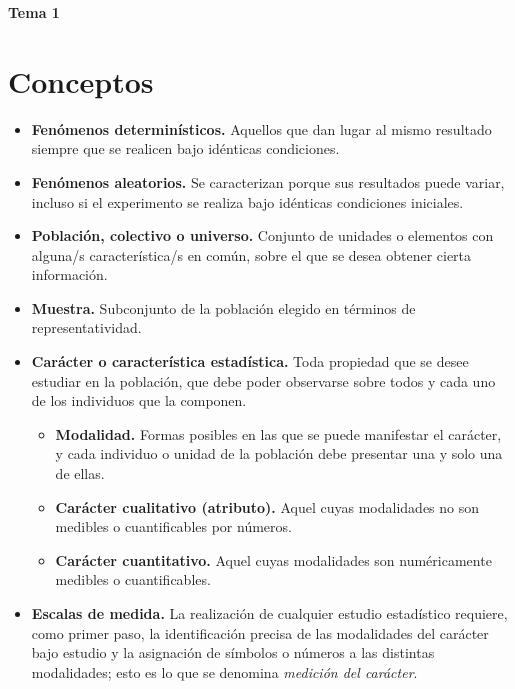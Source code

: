\documentclass[]{article}
\begin{document}
	\begin{center}
		\textbf{{\LARGE Tema 1}}
	\end{center}
	\vspace{0.5 cm}
	
	\section{Conceptos}
	
	\begin{itemize}
		\item \textbf{Fenómenos determinísticos. }Aquellos que dan lugar al mismo resultado siempre que se realicen bajo idénticas condiciones.
		\item \textbf{Fenómenos aleatorios. }Se caracterizan porque sus resultados puede variar, incluso si el experimento se realiza bajo idénticas condiciones iniciales.
		\item \textbf{Población, colectivo o universo. }Conjunto de unidades o elementos con alguna/s característica/s en común, sobre el que se desea obtener cierta información.
		\item \textbf{Muestra.} Subconjunto de la población elegido en términos de representatividad.
		\item \textbf{Carácter o característica estadística. }Toda propiedad que se desee estudiar en la población, que debe poder observarse sobre todos y cada uno de los individuos que la componen.
			\begin{itemize}
				\item \textbf{Modalidad. }Formas posibles en las que se puede manifestar el carácter, y cada individuo o unidad de la población debe presentar una y solo una de ellas.
				\item \textbf{Carácter cualitativo (atributo). }Aquel cuyas modalidades no son medibles o cuantificables por números.
				\item \textbf{Carácter cuantitativo. }Aquel cuyas modalidades son numéricamente medibles o cuantificables.
			\end{itemize}
		\item \textbf{Escalas de medida. }La realización de cualquier estudio estadístico requiere, como primer paso, la identificación precisa de las modalidades del carácter bajo estudio y la asignación de símbolos o números a las distintas modalidades; esto es lo que se denomina \textit{medición del carácter}.
		

\end{itemize}
\end{document}
